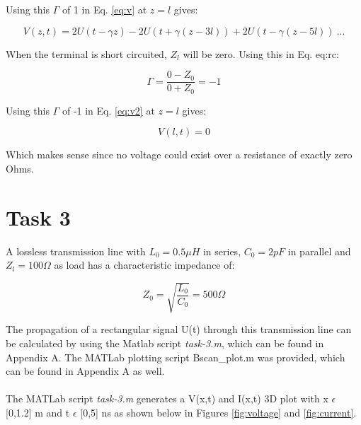 \documentclass[final]{scrreprt} %
\begin{document}
Using this $\Gamma$ of 1 in Eq. \ref{eq:v} at $z = l$ gives:

\begin{equation}
	V(z,t) = 2U(t - \gamma z) - 2U(t + \gamma(z - 3l)) + 2U(t - \gamma(z - 5l)) ~ ...
\label{eq:v2}
\end{equation}

When the terminal is short circuited, $Z_l$ will be zero. Using this in Eq. {eq:rc}:

\begin{equation}
	\Gamma = \frac{0 - Z_0}{0 + Z_0} = -1
\end{equation}

Using this $\Gamma$ of -1 in Eq. \ref{eq:v2} at $z = l$ gives:

\begin{equation}
	V(l,t) = 0
\end{equation}

Which makes sense since no voltage could exist over a resistance of exactly zero Ohms.

\section{Task 3}
A lossless transmission line with $L_0 = 0.5 \mu H$ in series, $C_0 = 2 pF$ in parallel and $Z_l = 100 \Omega$ as load has a characteristic impedance of:

\begin{equation}
	Z_0 = \sqrt{\frac{L_0}{C_0}} = 500 \Omega
\end{equation}

The propagation of a rectangular signal U(t) through this transmission line can be calculated by using the Matlab script \emph{task-3.m}, which can be found in Appendix A. The MATLab plotting script Bscan\_plot.m was provided, which can be found in Appendix A as well.
\\ \\
The MATLab script \emph{task-3.m} generates a V(x,t) and I(x,t) 3D plot with x $\epsilon$ [0,1.2] m and t $\epsilon$ [0,5] ns as shown below in Figures \ref{fig:voltage} and \ref{fig:current}.
\end{document}
